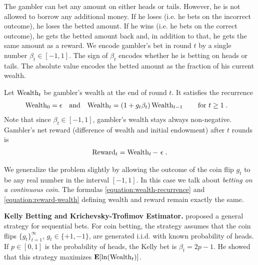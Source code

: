The gambler can bet any amount on either heads or tails. However, he is not
allowed to borrow any additional money. If he loses (i.e. he bets on the
incorrect outcome), he loses the betted amount. If he wins (i.e. he bets on the
correct outcome), he gets the betted amount back and, in addition to that, he
gets the same amount as a reward.
We encode gambler's bet in round $t$ by a single
number $\beta_t \in [-1,1]$. The sign of $\beta_t$ encodes whether he is betting
on heads or tails. The absolute value encodes the betted amount as the fraction
of his current wealth.

Let $\operatorname{Wealth}_t$ be gambler's wealth at the end of round $t$. It satisfies the
recurrence
\begin{align}
\label{equation:wealth-recurrence}
\operatorname{Wealth}_0 & = \epsilon &
& \text{and} &
\operatorname{Wealth}_t & = (1 + g_t \beta_t) \operatorname{Wealth}_{t-1} \qquad \text{for $t \ge 1$} \; .
\end{align}
Note that since $\beta_t \in [-1,1]$, gambler's wealth stays always non-negative.
Gambler's net reward (difference of wealth and initial endowment) after $t$
rounds is
\begin{align}
\label{equation:reward-wealth}
\operatorname{Reward}_t = \operatorname{Wealth}_t - \ \epsilon \; .
\end{align}

We generalize the problem slightly by allowing the outcome of the coin flip
$g_t$ to be any real number in the interval $[-1,1]$. In this case we talk about
\emph{betting on a continuous coin}. The formulas
\eqref{equation:wealth-recurrence} and \eqref{equation:reward-wealth} defining
wealth and reward remain exactly the same.

\textbf{Kelly Betting and Krichevsky-Trofimov Estimator.}
\citet{Kelly56} proposed a general strategy for sequential bets. For coin
betting, the strategy assumes that the coin flips $\{g_t\}_{t=1}^\infty$, $g_t
\in \{+1,-1\}$, are generated i.i.d. with known probability of heads. If $p \in
[0,1]$ is the probability of heads, the Kelly bet is
$\beta_t = 2p - 1$.
He showed that this strategy maximizes $\operatorname*{\mathbf{E}}[\ln(\operatorname{Wealth}_t)]$.

